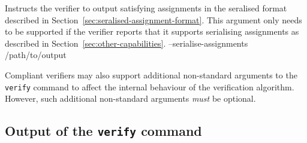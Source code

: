 

{Instructs the verifier to output satisfying assignments in the seralised format described in Section~\ref{sec:seralised-assignment-format}. This argument only needs to be supported if the verifier reports that it supports serialising assignments as described in Section~\ref{sec:other-capabilities}.}
{--serialise-assignments /path/to/output}

\noindent Compliant verifiers may also support additional non-standard arguments to the \texttt{verify} command to affect the internal behaviour of the verification algorithm. However, such additional non-standard arguments \textit{must} be optional.

\subsection{Output of the \texttt{verify} command}

